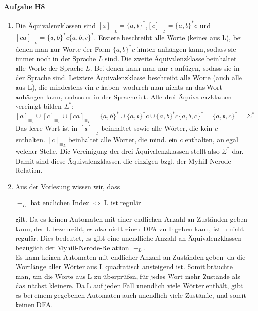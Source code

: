\documentclass[11pt]{article}
\begin{document}
\paragraph{Aufgabe H8}
\begin{enumerate}[label=\alph*)]
\item 	Die Äquivalenzklassen sind $[a]_{\equiv _{L}} = \{a,b\}^{*}$,$[c]_{\equiv _{L}} = \{a,b\}^{*}c$ und $[ca]_{\equiv _{L}} = \{a,b\}^{*}c\{a,b,c\}^{*}$. Erstere beschreibt alle Worte (keines aus L), bei denen man nur Worte der Form $\{a,b\}^{*}c$ hinten anhängen kann, sodass sie immer noch in der Sprache $L$ sind. Die zweite Äquivalenzklasse beinhaltet alle Worte der Sprache $L$. Bei denen kann man nur $\epsilon$ anfügen, sodass sie in der Sprache sind. Letztere Äquivalenzklasse beschreibt alle Worte (auch alle aus L), die mindestens ein $c$ haben, wodurch man nichts an das Wort anhängen kann, sodass es in der Sprache ist. Alle drei Äquivalenzklassen vereinigt bilden $\Sigma^{*}$:
\[[a]_{\equiv _{L}} \cup [c]_{\equiv _{L}} \cup [ca]_{\equiv _{L}} = \{a,b\}^{*} \cup \{a,b\}^{*}c \cup \{a,b\}^{*}c\{a,b,c\}^{*} = \{a,b,c\}^{*} = \Sigma^{*}\]
Das leere Wort ist in $[a]_{\equiv _{L}}$ beinhaltet sowie alle Wörter, die kein $c$ enthalten. $[c]_{\equiv _{L}}$ beinhaltet alle Wörter, die mind. ein $c$ enthalten, an egal welcher Stelle. Die Vereinigung der drei Äquivalenzklassen stellt also $\Sigma^{*}$ dar. 
\\Damit sind diese Äquivalenzklassen die einzigen bzgl. der Myhill-Nerode Relation.

\item	Aus der Vorlesung wissen wir, dass
\begin{center}
$\equiv _{L}$ hat endlichen Index $\Leftrightarrow$ L ist regulär
\end{center}gilt. Da es keinen Automaten mit einer endlichen Anzahl an Zuständen geben kann, der L beschreibt, es also nicht einen DFA zu L geben kann, ist L nicht regulär. Dies bedeutet, es gibt eine unendliche Anzahl an Äquivalenzklassen bezüglich der Myhill-Nerode-Relatiion $\equiv _{L}$.\\
Es kann keinen Automaten mit endlicher Anzahl an Zuständen geben, da die Wortlänge aller Wörter aus L quadratisch ansteigend ist. Somit bräuchte man, um die Worte aus L zu überprüfen, für jedes Wort mehr Zustände als das nächst kleinere. Da L auf jeden Fall unendlich viele Wörter enthält, gibt es bei einem gegebenen Automaten auch unendlich viele Zustände, und somit keinen DFA.
\end{enumerate}
\end{document}
